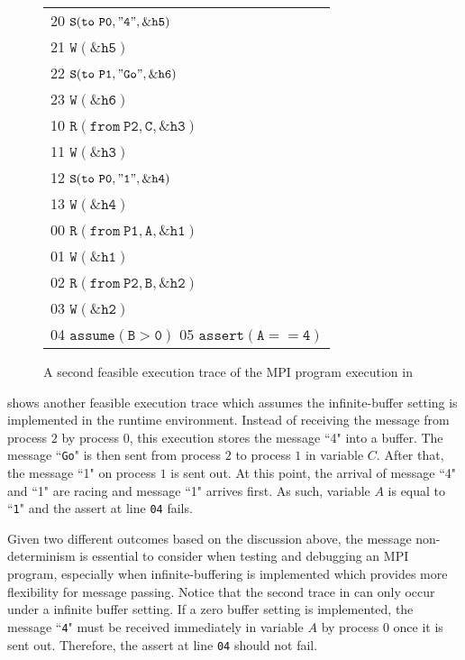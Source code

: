 \begin{figure}[t]
\begin{center}
\setlength{\tabcolsep}{2pt}
\small \begin{tabular}[t]{l}
20 $\mathtt{S(to\ P0, "4", \&h5)}$ \\
21 $\mathtt{W(\&h5)}$\\
22 $\mathtt{S(to\ P1, "Go", \&h6)}$ \\
23 $\mathtt{W(\&h6)}$ \\
\hline
10 $\mathtt{R(from\ P2, C, \&h3)}$ \\
11 $\mathtt{W(\&h3)}$ \\
12 $\mathtt{S(to\ P0, "1", \&h4)}$ \\
13 $\mathtt{W(\&h4)}$ \\
\hline
00 $\mathtt{R(from\ P1, A, \&h1)}$ \\
01 $\mathtt{W(\&h1)}$ \\
02 $\mathtt{R(from\ P2, B, \&h2)}$ \\
03 $\mathtt{W(\&h2)}$ \\
04 $\mathtt{assume(B > 0)}$
05 $\mathtt{assert(A == 4)}$ \\
\hline
\end{tabular}
\end{center}
\caption{A second feasible execution trace of the MPI program execution in }
\label{fig:trace2}
\end{figure}

 shows another feasible execution trace which assumes the infinite-buffer setting is implemented in the runtime environment. Instead of receiving the message from process $2$ by process $0$, this execution stores the message ``4" into a buffer. The message ``\texttt{Go}" is then sent from process $2$ to process $1$ in variable $C$. After that, the message ``1" on process $1$ is sent out. At this point, the arrival of message ``4" and ``1" are racing and message ``1" arrives first. As such, variable $A$ is equal to ``\texttt{1}" and the assert at line \texttt{04} fails.

Given two different outcomes based on the discussion above, the message non-determinism is essential to consider when testing and debugging an MPI program, especially when infinite-buffering is implemented which provides more flexibility for message passing. Notice that the second trace in  can only occur under a infinite buffer setting. If a zero buffer setting is implemented, the message ``\texttt{4}" must be received immediately in variable $A$ by process $0$ once it is sent out. Therefore, the assert at line \texttt{04} should not fail. 


